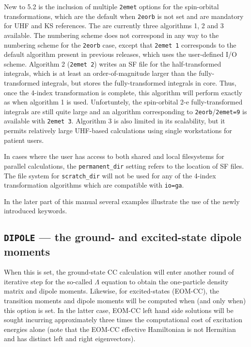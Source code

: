 New to 5.2 is the inclusion of multiple {\tt 2emet} options for the spin-orbital transformations, which
are the default when {\tt 2eorb} is not set and are mandatory for UHF and KS references.  The are currently
three algorithms 1, 2 and 3 available.  The numbering scheme does not correspond in any way to the numbering
scheme for the {\tt 2eorb} case, except that {\tt 2emet 1} corresponds to the default algorithm present in
previous releases, which uses the user-defined I/O scheme.  Algorithm 2 ({\tt 2emet 2}) writes an SF file
for the half-transformed integrals, which is at least an order-of-magnitude larger than the fully-transformed
integrals, but stores the fully-transformed integrals in core.  Thus, once the 4-index transformation is complete,
this algorithm will perform exactly as when algorithm 1 is used.  Unfortuntely, the spin-orbital 2-e 
fully-transformed integrals are still quite large and an algorithm corresponding to {\tt 2eorb}/{\tt 2emet=9}
is available with {\tt 2emet 3}.  Algorithm 3 is also limited in its scalability, but it permits
relatively large UHF-based calculations using single workstations for patient users.

In cases where the user has access to both shared and local filesystems for parallel calculations, 
the {\tt permanent\_dir} setting refers to the location of SF files.  The file system for {\tt scratch\_dir}
will not be used for any of the 4-index transformation algorithms which are compatible with {\tt io=ga}.
 
In the later part of this manual several examples illustrate the use of the newly introduced 
keywords.

\subsection{{\tt DIPOLE} --- the ground- and excited-state dipole moments}

When this is set, the ground-state CC calculation will enter another round 
of iterative step for the so-called $\Lambda$ equation to obtain the one-particle
density matrix and dipole moments.  Likewise, for excited-states (EOM-CC), the 
transition moments and dipole moments will be computed when (and only when) this
option is set.  In the latter case, EOM-CC left hand side solutions will be sought
incurring approximately three times the computational cost of excitation energies 
alone (note that the EOM-CC effective Hamiltonian is not Hermitian and has distinct
left and right eigenvectors).

